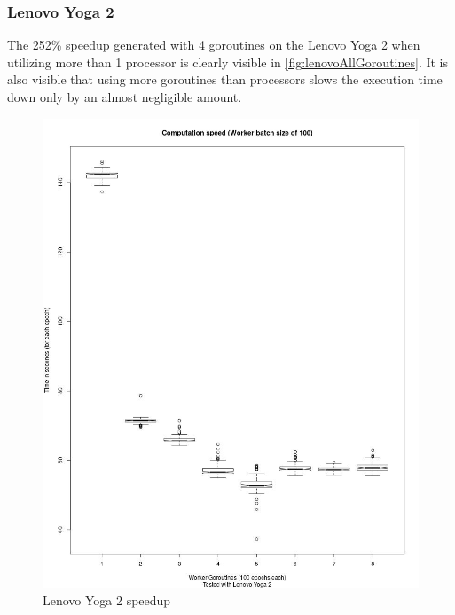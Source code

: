 \documentclass[11pt]{article}
\begin{document}
\subsubsection{Lenovo Yoga 2}
The 252\% speedup generated with 4 goroutines on the Lenovo Yoga 2 when utilizing more than 1 processor is clearly visible in \autoref{fig:lenovoAllGoroutines}. It is also visible that using more goroutines than processors slows the execution time down only by an almost negligible amount.
\begin{figure}[H]
	\centering
	\includegraphics[width=1.0\textwidth, height=0.75\textheight]{./Data/Final/Images/lenovoAllGoroutines.jpg}
	\vspace{-1em}
	\caption{Lenovo Yoga 2 speedup}
	\vspace{-0.5em}
	\label{fig:lenovoAllGoroutines}
\end{figure}
\end{document}

